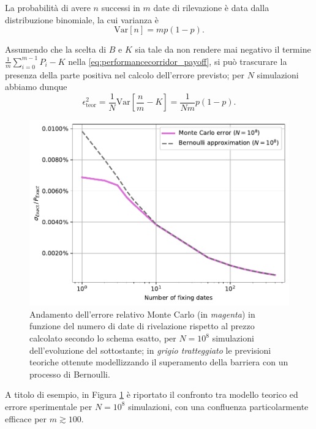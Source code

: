 La probabilità di avere $n$ successi in $m$ date di rilevazione è data dalla distribuzione binomiale, la cui varianza è
\begin{equation}
    \text{Var}[n] = mp(1-p).
    \label{eq:binomial_variance}
\end{equation}

Assumendo che la scelta di $B$ e $K$ sia tale da non rendere mai negativo il termine $\frac{1}{m} \sum_{i=0}^{m-1}{P_i} - K$ nella \eqref{eq:performancecorridor_payoff}, si può trascurare la presenza della parte positiva nel calcolo dell'errore previsto; per $N$ simulazioni abbiamo dunque
\begin{equation}
    \epsilon^2_{\text{teor}} = \frac{1}{N} \text{Var}\left[\frac{n}{m} - K\right] = \frac{1}{Nm} p(1-p).
    \label{eq:error_theoretical_squared}
\end{equation}

\begin{figure}[t]
    \centering
    \includegraphics[scale=0.5]{graphs/OptionPriceVsM_ExactErrorVsM_N108.pdf}
    \caption{Andamento dell'errore relativo Monte Carlo (in \textit{magenta}) in funzione del numero di date di rivelazione rispetto al prezzo calcolato secondo lo schema esatto, per $N={10}^8$ simulazioni dell'evoluzione del sottostante; in \textit{grigio tratteggiato} le previsioni teoriche ottenute modellizzando il superamento della barriera con un processo di Bernoulli.}
    \label{fig:theoretical_vs_experimental_error}
\end{figure}

A titolo di esempio, in Figura \ref{fig:theoretical_vs_experimental_error} è riportato il confronto tra modello teorico ed errore sperimentale per $N={10}^8$ simulazioni, con una confluenza particolarmente efficace per $m \gtrsim 100$.

